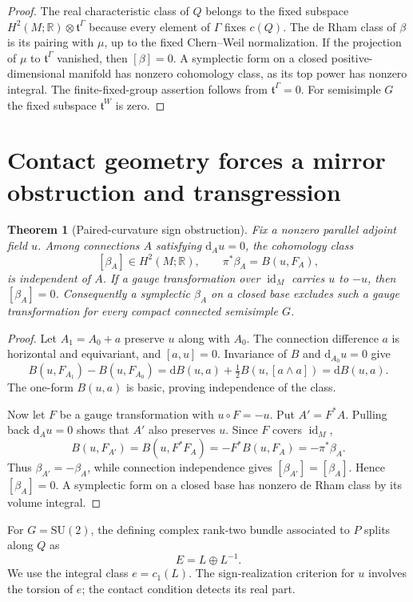 \documentclass[11pt]{amsart}
\newcommand{\dd}{\mathrm d}
\newcommand{\R}{\mathbb R}
\newcommand{\id}{\operatorname{id}}
\theoremstyle{plain}
\newtheorem{theorem}{Theorem}[section]
\theoremstyle{definition}
\theoremstyle{remark}
\begin{document}
\begin{proof}
The real characteristic class of $Q$ belongs to the fixed subspace
$H^2(M;\mathbb R)\otimes\mathfrak t^\Gamma$ because every element of
$\Gamma$ fixes $c(Q)$. The de Rham class of $\beta$ is its pairing with
$\mu$, up to the fixed Chern--Weil normalization. If the projection of
$\mu$ to $\mathfrak t^\Gamma$ vanished, then $[\beta]=0$. A symplectic
form on a closed positive-dimensional manifold has nonzero cohomology
class, as its top power has nonzero integral. The finite-fixed-group
assertion follows from $\mathfrak t^\Gamma=0$. For semisimple $G$ the
fixed subspace $\mathfrak t^W$ is zero.
\end{proof}

\section{Contact geometry forces a mirror obstruction and transgression}\label{sec:contact}

\begin{theorem}[Paired-curvature sign obstruction]\label{thm:betaobstruction}
Fix a nonzero parallel adjoint field $u$.  Among connections $A$ satisfying $\dd_Au=0$, the cohomology class
\[
 [\beta_A]\in H^2(M;\R),\qquad \pi^*\beta_A=B(u,F_A),
\]
is independent of $A$.  If a gauge transformation over $\id_M$ carries $u$ to $-u$, then $[\beta_A]=0$.  Consequently a symplectic $\beta_A$ on a closed base excludes such a gauge transformation for every compact connected semisimple $G$.
\end{theorem}

\begin{proof}
Let $A_1=A_0+a$ preserve $u$ along with $A_0$.  The connection difference $a$ is horizontal and equivariant, and $[a,u]=0$.  Invariance of $B$ and $\dd_{A_0}u=0$ give
\[
 B(u,F_{A_1})-B(u,F_{A_0})
 =\dd B(u,a)+\tfrac12B(u,[a\wedge a])
 =\dd B(u,a).
\]
The one-form $B(u,a)$ is basic, proving independence of the class.

Now let $F$ be a gauge transformation with $u\circ F=-u$.  Put $A'=F^*A$.  Pulling back $\dd_Au=0$ shows that $A'$ also preserves $u$.  Since $F$ covers $\id_M$,
\[
 B(u,F_{A'})=B(u,F^*F_A)
 =-F^*B(u,F_A)=-\pi^*\beta_A.
\]
Thus $\beta_{A'}=-\beta_A$, while connection independence gives $[\beta_{A'}]=[\beta_A]$.  Hence $[\beta_A]=0$.  A symplectic form on a closed base has nonzero de Rham class by its volume integral.
\end{proof}

For $G=\mathrm{SU}(2)$, the defining complex rank-two bundle associated to $P$ splits along $Q$ as
\begin{equation}\label{eq:eigensplit}
 E=L\oplus L^{-1}.
\end{equation}
We use the integral class $e=c_1(L)$.  The sign-realization criterion for $u$ involves the torsion of $e$; the contact condition detects its real part.
\end{document}
